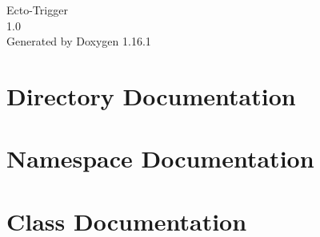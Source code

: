 \documentclass[twoside]{book}
\newcommand{\+}{\discretionary{\mbox{\scriptsize$\hookleftarrow$}}{}{}}
\newcommand{\clearemptydoublepage}{%
    \newpage{\pagestyle{empty}\cleardoublepage}%
  }
\begin{document}
  \raggedbottom
    \hypersetup{pageanchor=false,
                bookmarksnumbered=true,
                pdfencoding=unicode
               }
  \begin{titlepage}
  \vspace*{7cm}
  \begin{center}%
  {\Large Ecto-\/\+Trigger}\\
  [1ex]\large 1.\+0 \\
  \vspace*{1cm}
  {\large Generated by Doxygen 1.16.1}\\
  \end{center}
  \end{titlepage}
  \clearemptydoublepage
  \tableofcontents
  \clearemptydoublepage
  \hypersetup{pageanchor=true}




\chapter{Directory Documentation}

\chapter{Namespace Documentation}








\chapter{Class Documentation}








  \backmatter
  \newpage
  \clearemptydoublepage
  \printindex
\end{document}
